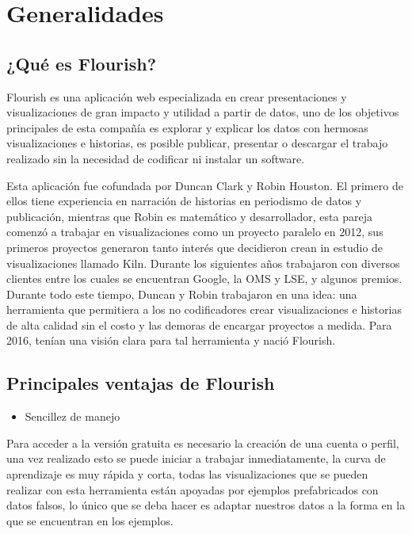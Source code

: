 \documentclass[
]{book}
\providecommand{\tightlist}{%
  \setlength{\itemsep}{0pt}\setlength{\parskip}{0pt}}
\begin{document}
\hypertarget{generalidadesflourish}{%
\section{Generalidades}\label{generalidadesflourish}}

\hypertarget{quuxe9-es-flourish}{%
\subsection{¿Qué es Flourish?}\label{quuxe9-es-flourish}}

Flourish es una aplicación web especializada en crear presentaciones y visualizaciones de gran impacto y utilidad a partir de datos, uno de los objetivos principales de esta compañía es explorar y explicar los datos con hermosas visualizaciones e historias, es posible publicar, presentar o descargar el trabajo realizado sin la necesidad de codificar ni instalar un software.

Esta aplicación fue cofundada por Duncan Clark y Robin Houston. El primero de ellos tiene experiencia en narración de historias en periodismo de datos y publicación, mientras que Robin es matemático y desarrollador, esta pareja comenzó a trabajar en visualizaciones como un proyecto paralelo en 2012, sus primeros proyectos generaron tanto interés que decidieron crean in estudio de visualizaciones llamado Kiln. Durante los siguientes años trabajaron con diversos clientes entre los cuales se encuentran Google, la OMS y LSE, y algunos premios. Durante todo este tiempo, Duncan y Robin trabajaron en una idea: una herramienta que permitiera a los no codificadores crear visualizaciones e historias de alta calidad sin el costo y las demoras de encargar proyectos a medida. Para 2016, tenían una visión clara para tal herramienta y nació Flourish.

\hypertarget{principales-ventajas-de-flourish}{%
\subsection{Principales ventajas de Flourish}\label{principales-ventajas-de-flourish}}

\begin{itemize}
\tightlist
\item
  Sencillez de manejo
\end{itemize}

Para acceder a la versión gratuita es necesario la creación de una cuenta o perfil, una vez realizado esto se puede iniciar a trabajar inmediatamente, la curva de aprendizaje es muy rápida y corta, todas las visualizaciones que se pueden realizar con esta herramienta están apoyadas por ejemplos prefabricados con datos falsos, lo único que se deba hacer es adaptar nuestros datos a la forma en la que se encuentran en los ejemplos.
\end{document}
